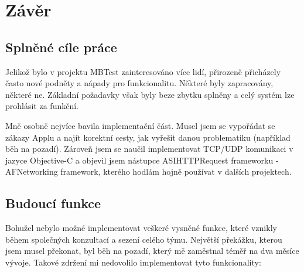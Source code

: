 \chapter{Závěr}

\section{Splněné cíle práce}
Jelikož bylo v projektu MBTest zainteresováno více lidí, přirozeně přicházely často nové podněty a nápady pro funkcionalitu. Některé byly zapracovány, některé ne. Základní požadavky však byly beze zbytku splněny a celý systém lze prohlásit za funkční.

Mně osobně nejvíce bavila implementační část. Musel jsem se vypořádat se zákazy Applu a najít korektní cesty, jak vyřešit danou problematiku (například běh na pozadí). Zároveň jsem se naučil implementovat TCP/UDP komunikaci v jazyce Objective-C a objevil jsem nástupce ASIHTTPRequest frameworku - AFNetworking framework, kterého hodlám hojně používat v dalších projektech.

\section{Budoucí funkce}
Bohužel nebylo možné implementovat veškeré vysněné funkce, které vznikly během společných konzultací a sezení celého týmu. Největší překážku, kterou jsem musel překonat, byl běh na pozadí, který mě zaměstnal téměř na dva měsíce vývoje. Takové zdržení mi nedovolilo implementovat tyto funkcionality:

